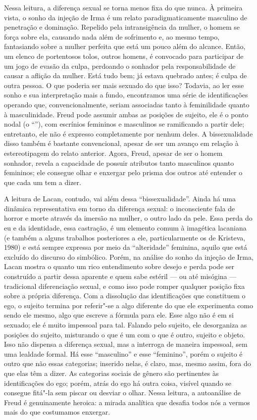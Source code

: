 Nessa leitura, a diferença sexual se torna menos fixa do que nunca. À
primeira vista, o sonho da injeção de Irma é um relato
paradigmaticamente masculino de penetração e dominação. Repelido pela
intransigência da mulher, o homem se força sobre ela, causando nada além
de sofrimento e, ao mesmo tempo, fantasiando sobre a mulher perfeita que
está um pouco além do alcance. Então, um elenco de portentosos tolos,
outros homens, é convocado para participar de um jogo de evasão da
culpa, perdoando o sonhador pela responsabilidade de causar a aflição da
mulher. Está tudo bem; já estava quebrado antes; é culpa de outra
pessoa. O que poderia ser mais sexuado do que isso? Todavia, ao ler esse
sonho e sua interpretação mais a fundo, encontramos uma série de
identificações operando que, convencionalmente, seriam associadas tanto
à feminilidade quanto à masculinidade. Freud pode assumir ambas as
posições de sujeito, ele é o ponto nodal (o ``''), com escrínios
femininos e masculinos se ramificando a partir dele; entretanto, ele não
é expresso completamente por nenhum deles. A bissexualidade disso também
é bastante convencional, apesar de ser um avanço em relação à
estereotipagem do relato anterior. Agora, Freud, apesar de ser o homem
sonhador, revela a capacidade de possuir atributos tanto masculinos
quanto femininos; ele consegue olhar e enxergar pelo prisma dos outros
até entender o que cada um tem a dizer.

A leitura de Lacan, contudo, vai além dessa ``bissexualidade''. Ainda há
uma dinâmica representativa em torno da diferença sexual: o inconsciente
fala de horror e morte através da imersão na mulher, o outro lado da
pele. Essa perda do eu e da identidade, essa castração, é um elemento
comum à imagética lacaniana (e também a alguns trabalhos posteriores a
ele, particularmente os de Kristeva, 1980) e está sempre expressa por
meio da ``alteridade'' feminina, aquilo que está excluído do discurso do
simbólico. Porém, na análise do sonho da injeção de Irma, Lacan mostra o
quanto um rico entendimento sobre desejo e perda pode ser construído a
partir dessa aparente e quem sabe estéril --- ou até misógina ---
tradicional diferenciação sexual, e como isso pode romper qualquer
posição fixa sobre a própria diferença. Com a dissolução das
identificações que constituem o ego, o sujeito termina por referir"-se a
algo diferente do que ele experimenta como sendo ele mesmo, algo que
escreve a fórmula para ele. Esse algo não é em si sexuado; ele é muito
impessoal para tal. Falando pelo sujeito, ele desorganiza as posições do
sujeito, misturando o que é um com o que é outro, sujeito e objeto. Isso
não dispensa a diferença sexual, mas a interroga de maneira impessoal,
sem uma lealdade formal. Há esse ``masculino'' e esse ``feminino'',
porém o sujeito é outro que não essas categorias; inserido nelas, é
claro, mas, mesmo assim, fora do que elas têm a dizer. As categorias
sociais de gênero são pertinentes às identificações do ego; porém, atrás
do ego há outra coisa, visível quando se consegue fitá"-la sem piscar ou
desviar o olhar. Nessa leitura, a autoanálise de Freud é genuinamente
heroica: a mirada analítica que desafia todos nós a vermos mais do que
costumamos enxergar.


